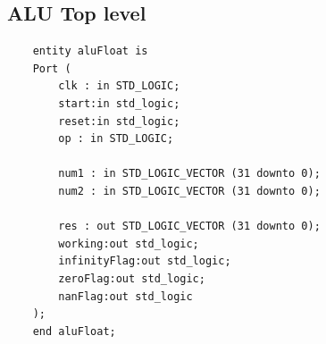 \documentclass[a4paper,10pt]{article}
\begin{document}
    \subsection{ALU Top level}
    \begin{lstlisting}
    entity aluFloat is
    Port (
        clk : in STD_LOGIC;
        start:in std_logic;
        reset:in std_logic;
        op : in STD_LOGIC;

        num1 : in STD_LOGIC_VECTOR (31 downto 0);
        num2 : in STD_LOGIC_VECTOR (31 downto 0);

        res : out STD_LOGIC_VECTOR (31 downto 0);
        working:out std_logic;
        infinityFlag:out std_logic;
        zeroFlag:out std_logic;
        nanFlag:out std_logic
    );
    end aluFloat;
    \end{lstlisting}

    \label{sec:ROM}
\end{document}
